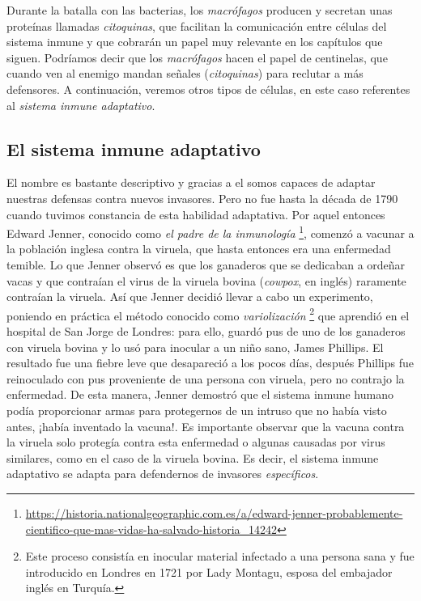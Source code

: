 Durante la batalla con las bacterias, los \textit{macrófagos} producen y secretan unas proteínas llamadas \textit{citoquinas}, que facilitan la comunicación entre células del sistema inmune y que cobrarán un papel muy relevante en los capítulos que siguen.
Podríamos decir que los \textit{macrófagos} hacen el papel de centinelas, que cuando ven al enemigo mandan señales (\textit{citoquinas}) para reclutar a más defensores. A continuación, veremos otros tipos de células, en este caso referentes al \textit{sistema inmune adaptativo}.

\subsection{El sistema inmune adaptativo}


El nombre es bastante descriptivo y gracias a el somos capaces de adaptar nuestras defensas contra nuevos invasores. Pero no fue hasta la década de  1790 cuando tuvimos constancia de esta habilidad adaptativa. Por aquel entonces Edward Jenner, conocido como \textit{el padre de la inmunología} \footnote{\url{https://historia.nationalgeographic.com.es/a/edward-jenner-probablemente-cientifico-que-mas-vidas-ha-salvado-historia_14242}}, comenzó a vacunar a la población inglesa contra la viruela, que hasta entonces era una enfermedad temible. Lo que Jenner observó es que los ganaderos que se dedicaban a ordeñar vacas y que contraían el virus de la viruela bovina (\textit{cowpox}, en inglés) raramente contraían la viruela. Así que Jenner decidió llevar a cabo un experimento, poniendo en práctica el método conocido como \textit{variolización} \footnote{Este proceso consistía en inocular material infectado a una persona sana y fue introducido en Londres en 1721 por  Lady Montagu, esposa del embajador inglés en Turquía.} que aprendió en el hospital de San Jorge de Londres: para ello, guardó pus de uno de los ganaderos con viruela bovina y lo usó para inocular a un niño sano, James Phillips. El resultado fue una fiebre leve que desapareció a los pocos días, después Phillips fue reinoculado con pus proveniente de una persona con viruela, pero no contrajo la enfermedad. De esta manera, Jenner demostró que el sistema inmune humano podía proporcionar armas para protegernos de un intruso que no había visto antes, ¡había inventado la vacuna!. Es importante observar que la vacuna contra la viruela solo protegía contra esta enfermedad o algunas causadas por virus similares, como en el caso de la viruela bovina. Es decir, el sistema inmune adaptativo se adapta para defendernos de invasores \textit{específicos}. 

